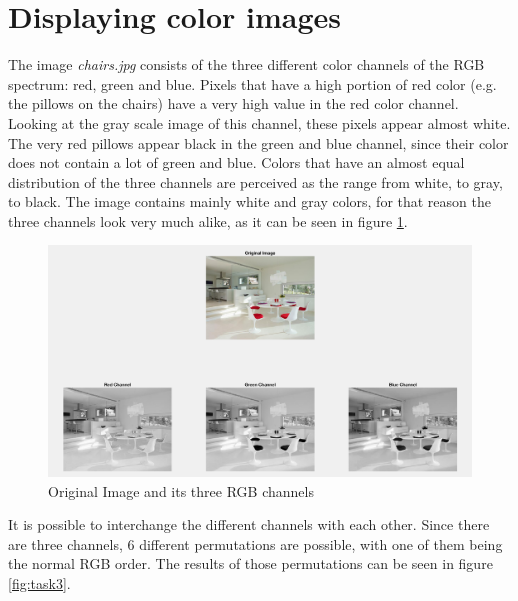 \section{Displaying color images}

The image \textit{chairs.jpg} consists of the three different color channels of the RGB spectrum: red, green and blue. Pixels that have a high portion of red color (e.g. the pillows on the chairs) have a very high value in the red color channel. Looking at the gray scale image of this channel, these pixels appear almost white. The very red pillows appear black in the green and blue channel, since their color does not contain a lot of green and blue. Colors that have an almost equal distribution of the three channels are perceived as the range from white, to gray, to black. The image contains mainly white and gray colors, for that reason the three channels look very much alike, as it can be seen in figure \ref{fig:task2}.

\begin{figure}[!hbt]
  \includegraphics[width=\textwidth]{./img/task2.png}
  \caption{Original Image and its three RGB channels}
  \label{fig:task2}
\end{figure}

It is possible to interchange the different channels with each other. Since there are three channels, 6 different permutations are possible, with one of them being the normal RGB order. The results of those permutations can be seen in figure \ref{fig:task3}.

